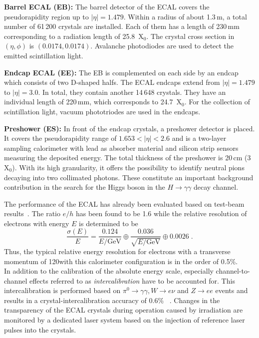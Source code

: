 \begin{description}
 \item \textbf{Barrel ECAL (EB):} The barrel detector of the ECAL covers the pseudorapidity region up to $|\eta| = 1.479$. Within a radius of about 1.3\,m, a total number of 61\,200 crystals are installed. Each of them has a length of 230\,mm corresponding to a radiation length of 25.8~$\mathrm{X_0}$. The crystal cross section in $(\eta, \phi)$ is $(0.0174, 0.0174)$. Avalanche photodiodes are used to detect the emitted scintillation light.
 \item \textbf{Endcap ECAL (EE):} The EB is complemented on each side by an endcap which consists of two D-shaped halfs. The ECAL endcaps extend from $|\eta| = 1.479$ to $|\eta| = 3.0$. In total, they contain another 14\,648 crystals. They have an individual length of 220\,mm, which corresponds to 24.7~$\mathrm{X}_0$. For the collection of scintillation light, vacuum phototriodes are used in the endcaps.
 \item \textbf{Preshower (ES):} In front of the endcap crystals, a preshower detector is placed. It covers the pseudorapidity range of $1.653 < |\eta| <2.6$ and is a two-layer sampling calorimeter with lead as absorber material and silicon strip sensors measuring the deposited energy. The total thickness of the preshower is 20\,cm (3~$\mathrm{X_0}$). With its high granularity, it offers the possibility to identify neutral pions decaying into two collimated photons. These constitute an important background contribution in the search for the Higgs boson in the $H \rightarrow \gamma \gamma$ decay channel.
\end{description}
The performance of the ECAL has already been evaluated based on test-beam results~\cite{Abramov:2000vd, springerlink:10.1140/epjc/s10052-009-0959-5}. The ratio $e/h$ has been found to be 1.6 while the relative resolution of electrons with energy $E$ is determined to be
\begin{equation}
\frac{\sigma(E)}{E}= \frac{0.124}{E/\mathrm{GeV}} \oplus \frac{0.036}{\sqrt{E/\mathrm{GeV}}} \oplus 0.0026 \; .
\end{equation}
Thus, the typical relative energy resolution for electrons with a transverse momentum of 120\gev with this calorimeter configuration is in the order of 0.5\%. \\
In addition to the calibration of the absolute energy scale, especially channel-to-channel effects referred to as \textit{intercalibration} have to be accounted for. This intercalibration is performed based on $\pi^0 \rightarrow \gamma \gamma, W \rightarrow e\nu$ and $Z \rightarrow ee$ events and results in a crystal-intercalibration accuracy of 0.6\% ~\cite{Chatrchyan:2013dga}. Changes in the transparency of the ECAL crystals during operation caused by irradiation are monitored by a dedicated laser system based on the injection of reference laser pulses into the crystals. 

